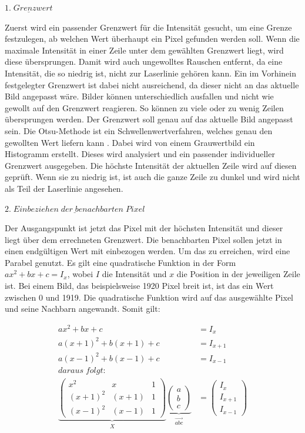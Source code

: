 	$\underline{1. \; Grenzwert}$
	
	Zuerst wird ein passender Grenzwert für die Intensität gesucht, um eine Grenze festzulegen, ab welchen Wert überhaupt ein Pixel gefunden werden soll. Wenn die maximale Intensität in einer Zeile unter dem gewählten Grenzwert liegt, wird diese übersprungen. Damit wird auch ungewolltes Rauschen entfernt, da eine Intensität, die so niedrig ist, nicht zur Laserlinie gehören kann. Ein im Vorhinein festgelegter Grenzwert ist dabei nicht ausreichend, da dieser nicht an das aktuelle Bild angepasst wäre. Bilder können unterschiedlich ausfallen und nicht wie gewollt auf den Grenzwert reagieren. So können zu viele oder zu wenig Zeilen übersprungen werden. Der Grenzwert soll genau auf das aktuelle Bild angepasst sein. Die Otsu-Methode ist ein Schwellenwertverfahren, welches genau den gewollten Wert liefern kann \citep[vgl.][]{otsu_tresh}. Dabei wird von einem Grauwertbild ein Histogramm erstellt. Dieses wird analysiert und ein passender individueller Grenzwert ausgegeben. Die höchste Intensität der aktuellen Zeile wird auf diesen geprüft. Wenn sie zu niedrig ist, ist auch die ganze Zeile zu dunkel und wird nicht als Teil der Laserlinie angesehen.
	
	$\underline{2. \; Einbeziehen \; der \; benachbarten \; Pixel}$
	
	Der Ausgangspunkt ist jetzt das Pixel mit der höchsten Intensität und dieser liegt über dem errechneten Grenzwert. Die benachbarten Pixel sollen jetzt in einen endgültigen Wert mit einbezogen werden. Um das zu erreichen, wird eine Parabel genutzt. Es gilt eine quadratische Funktion in der Form \( ax^2 + bx + c = I_x \), wobei \( I \) die Intensität und \( x \) die Position in der jeweiligen Zeile ist. Bei einem Bild, das beispielsweise 1920 Pixel breit ist, ist das ein Wert zwischen 0 und 1919. Die quadratische Funktion wird auf das ausgewählte Pixel und seine Nachbarn angewandt. Somit gilt:
	
	\begin{equation}
	\begin{aligned}
	ax^2 + bx + c &= I_x \\
	a(x+1)^2 + b(x+1) + c &= I_{x+1} \\
	a(x-1)^2 + b(x-1) + c &= I_{x-1} \\
	daraus \; folgt: \\
	\underbrace{\begin{pmatrix}
		x^2 & x & 1 \\
		(x+1)^2 & (x+1) & 1 \\
		(x-1)^2 & (x-1) & 1 
		\end{pmatrix}}_{\substack{X}} \underbrace{ \begin{pmatrix}
		a \\
		b \\
		c
		\end{pmatrix}}_{\substack{\vec{abc}}} &= \begin{pmatrix}
	I_x \\
	I_{x+1} \\
	I_{x-1}
	\end{pmatrix}
	\end{aligned}
	\label{eq:subpixel_x}
	\end{equation}
	
